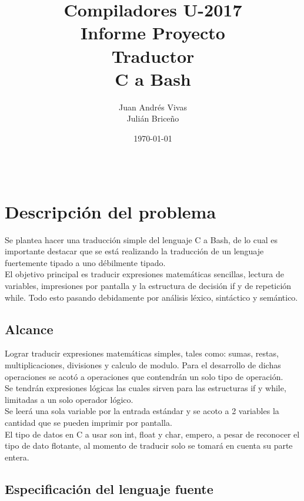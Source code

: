 \documentclass[aspectratio=169]{article}
\title{Compiladores U-2017 \\ Informe Proyecto \\ Traductor \\ C a Bash} %
\author{Juan Andr\'es Vivas\\
		Juli\'an Brice\~no} %
\date{\today} %
\begin{document}
\maketitle %

\begin{center}
\begin{tabular}{l r}

\end{tabular}
\end{center}

\newpage

\section{Descripci\'on del problema}

	Se plantea hacer una traducci\'on simple del lenguaje C a Bash, de lo cual es importante destacar que se est\'a realizando la traducci\'on de un lenguaje fuertemente tipado a uno débilmente tipado.\\

	El objetivo principal es traducir expresiones matem\'aticas sencillas, lectura de variables, impresiones por pantalla y la estructura de decisión if y de repetición while. Todo esto pasando debidamente por an\'alisis l\'exico, sint\'actico y sem\'antico.

\subsection{Alcance}

	Lograr traducir expresiones matem\'aticas simples, tales como: sumas, restas, multiplicaciones, divisiones y calculo de modulo. Para el desarrollo de dichas operaciones se acot\'o a operaciones que contendrán un solo tipo de operación. \\

	Se tendrán expresiones l\'ogicas las cuales sirven para las estructuras if y while, limitadas a un solo operador l\'ogico.\\

	Se leerá una sola variable por la entrada estándar y se acoto a 2 variables la cantidad que se pueden imprimir por pantalla.\\

	El tipo de datos en C a usar son int, float y char, empero, a pesar de reconocer el tipo de dato flotante, al momento de traducir solo se tomar\'a en cuenta su parte entera.

\subsection{Especificaci\'on del lenguaje fuente}
\end{document}
